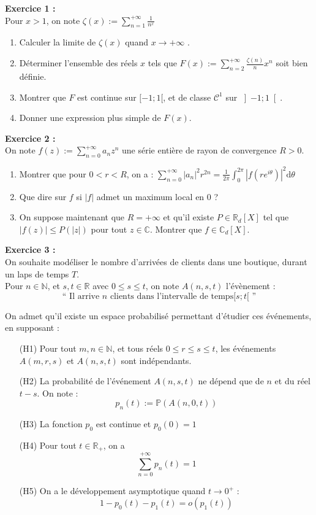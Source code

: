 \documentclass[11pt,a4paper]{article}
\begin{document}
\textbf{Exercice 1 :}  \\
Pour $x>1$, on note $ \zeta (x) := \displaystyle \sum_{n=1}^{+\infty} \frac{1}{n^x}$ \\

\begin{enumerate}
\item Calculer la limite de $\zeta (x)$ quand $x \to +\infty$ .
\item Déterminer l'ensemble des réels $x$ tels que $ F(x) := \displaystyle \sum_{n=2}^{+\infty} \frac{\zeta(n)}{n}x^n$ soit bien définie.
\item Montrer que $F$ est continue sur $[-1;1[$, et de classe $\mathcal{C}^1$ sur $\left ] -1;1 \right [$.
\item Donner une expression plus simple de $F(x)$. \\
\end{enumerate} 


\textbf{Exercice 2 :} \\
On note $f(z) := \displaystyle \sum_{n=0}^{+\infty} a_n z^n$ une série entière de rayon de convergence $R >0$.
\begin{enumerate}
\item Montrer que pour $0<r<R$, on a : $\displaystyle \sum_{n=0}^{+\infty}|a_n|^2r^{2n}=\frac{1}{2\pi}\int_0^{2\pi} |f(re^{i\theta})|^2\mathrm{d}\theta $
\item Que dire sur $f$ si $|f|$ admet un maximum local en 0 ?
\item On suppose maintenant que $R=+\infty$ et qu'il existe $P \in \mathbb{R}_d[X]$ tel que $|f(z)|\leq P(|z|)$ pour tout $z \in \mathbb{C}$. Montrer que $f\in \mathbb{C}_d[X]$. \\
\end{enumerate}

\textbf{Exercice 3 :} \\
 On souhaite modéliser le nombre d'arrivées de clients dans une boutique, durant un laps de temps $T$. \\
Pour $n\in \mathbb{N}$, et $s,t \in \mathbb{R}$ avec $0\leq s\leq t$, on note $A(n,s,t)$ l'évènement :
\[\text{`` Il arrive } n \text{ clients dans l'intervalle de temps} [s;t[ \text{ ''}\]

On admet qu'il existe un espace probabilisé permettant d'étudier ces événements, en supposant : \\
\begin{itemize}
\item[(H1)] Pour tout $m,n \in \mathbb{N}$, et tous réels $0\leq r \leq s \leq t$, les événements $A(m,r,s)$ et $A(n,s,t)$ sont indépendants.
\item[(H2)] La probabilité de l'événement $A(n,s,t)$ ne dépend que de $n$ et du réel $t-s$. On note : \[p_n(t) := \mathbb{P}(A(n,0,t))\]
\item[(H3)] La fonction $p_0$ est continue et $p_0(0)=1$
\item[(H4)] Pour tout $t\in \mathbb{R}_+$, on a \[\sum_{n=0}^{+\infty}p_n(t)=1\]
\item[(H5)] On a le développement asymptotique quand $t \to 0^+$ : \[1-p_0(t)-p_1(t) = o(p_1(t))\]
\end{itemize}
\end{document}
